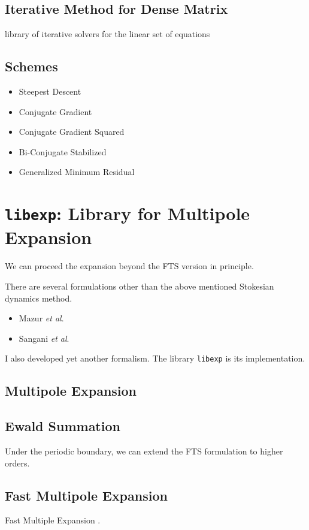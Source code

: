 \documentclass{book}
\begin{document}
\section{Iterative Method for Dense Matrix}
library of iterative solvers for the linear set of equations
\cite{IchikiBrady2001}


\section{Schemes}
\begin{itemize}
\item Steepest Descent
\item Conjugate Gradient
\item Conjugate Gradient Squared
\item Bi-Conjugate Stabilized
\item Generalized Minimum Residual
\end{itemize}



\chapter{{\tt libexp}:
  Library for Multipole Expansion}
\label{chp:libexp}
We can proceed the expansion beyond the FTS version in principle.

There are several formulations other than the above mentioned
Stokesian dynamics method.
\begin{itemize}
\item Mazur {\it et al}.
\item Sangani {\it et al}.
\end{itemize}
I also developed yet another formalism.\cite{Ichiki2002}
The library {\tt libexp} is its implementation.


\section{Multipole Expansion}


\section{Ewald Summation}
Under the periodic boundary,
we can extend the FTS formulation to higher orders.



\section{Fast Multipole Expansion}
Fast Multiple Expansion
\cite{greengard,GreengardRokhlin1987}.
\end{document}
